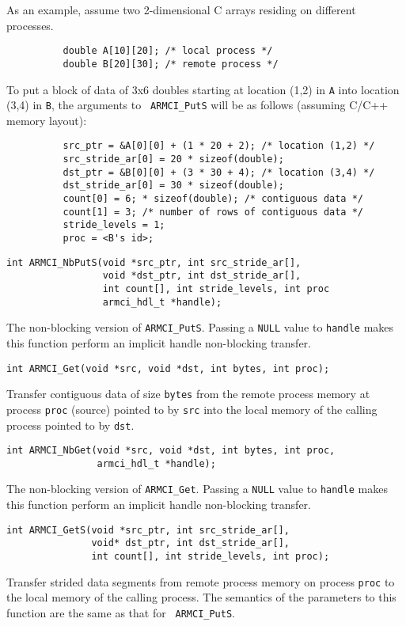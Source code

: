 \documentclass[10pt]{article}
\begin{document}
As an example, assume two 2-dimensional C arrays residing on different
processes.

\begin{verbatim}
          double A[10][20]; /* local process */
          double B[20][30]; /* remote process */
\end{verbatim}

To put a block of data of 3x6 doubles starting at location (1,2) in
{\tt A} into location (3,4) in {\tt B}, the arguments to {\tt
ARMCI\_PutS} will be as follows (assuming C/C++ memory layout):

\begin{verbatim}
          src_ptr = &A[0][0] + (1 * 20 + 2); /* location (1,2) */
          src_stride_ar[0] = 20 * sizeof(double);
          dst_ptr = &B[0][0] + (3 * 30 + 4); /* location (3,4) */
          dst_stride_ar[0] = 30 * sizeof(double);
          count[0] = 6; * sizeof(double); /* contiguous data */
          count[1] = 3; /* number of rows of contiguous data */
          stride_levels = 1;
          proc = <B's id>;
\end{verbatim}

\begin{verbatim}
int ARMCI_NbPutS(void *src_ptr, int src_stride_ar[],
                 void *dst_ptr, int dst_stride_ar[],
                 int count[], int stride_levels, int proc
                 armci_hdl_t *handle);
\end{verbatim}
The non-blocking version of {\tt ARMCI\_PutS}. Passing a {\tt NULL}
value to {\tt handle} makes this function perform an implicit handle
non-blocking transfer.

\begin{verbatim}
int ARMCI_Get(void *src, void *dst, int bytes, int proc);
\end{verbatim}
Transfer contiguous data of size {\tt bytes} from the remote process
memory at process {\tt proc} (source) pointed to by {\tt src} into the
local memory of the calling process pointed to by {\tt dst}.

\begin{verbatim}
int ARMCI_NbGet(void *src, void *dst, int bytes, int proc,
                armci_hdl_t *handle);
\end{verbatim}
The non-blocking version of {\tt ARMCI\_Get}. Passing a {\tt NULL}
value to {\tt handle} makes this function perform an implicit handle
non-blocking transfer.

\begin{verbatim}
int ARMCI_GetS(void *src_ptr, int src_stride_ar[],
               void* dst_ptr, int dst_stride_ar[],
               int count[], int stride_levels, int proc);
\end{verbatim}
Transfer strided data segments from remote process memory on process
{\tt proc} to the local memory of the calling process. The semantics
of the parameters to this function are the same as that for {\tt
ARMCI\_PutS}.
\end{document}
